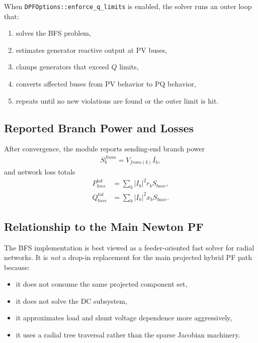 When \texttt{DPFOptions::enforce\_q\_limits} is enabled, the solver runs an outer
loop that:
\begin{enumerate}
  \item solves the BFS problem,
  \item estimates generator reactive output at PV buses,
  \item clamps generators that exceed \(Q\) limits,
  \item converts affected buses from PV behavior to PQ behavior,
  \item repeats until no new violations are found or the outer limit is hit.
\end{enumerate}

\subsection{Reported Branch Power and Losses}

After convergence, the module reports sending-end branch power
\begin{align}
S_b^{from} = V_{from(b)}\overline{I_b},
\end{align}
and network loss totals
\begin{align}
P_{loss}^{tot} &= \sum_b |I_b|^2 r_b S_{base}, \\
Q_{loss}^{tot} &= \sum_b |I_b|^2 x_b S_{base}.
\end{align}

\subsection{Relationship to the Main Newton PF}

The BFS implementation is best viewed as a feeder-oriented fast solver for radial
networks.  It is \emph{not} a drop-in replacement for the main projected hybrid
PF path because:
\begin{itemize}
  \item it does not consume the same projected component set,
  \item it does not solve the DC subsystem,
  \item it approximates load and shunt voltage dependence more aggressively,
  \item it uses a radial tree traversal rather than the sparse Jacobian machinery.
\end{itemize}

